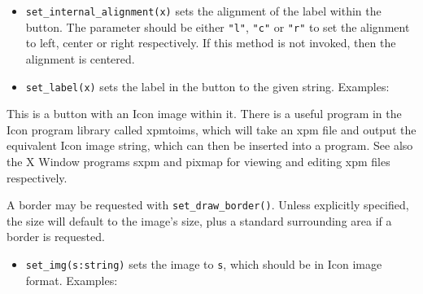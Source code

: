 \begin{itemize}
\item\noindent\texttt{set\_internal\_alignment(x)} sets the alignment of the label within the
button. The \linebreak parameter should be either \texttt{"l"}, \texttt{"c"} or \texttt{"r"} to
set the alignment to left, center or right respectively. If this method
is not invoked, then the alignment is centered.

\item\noindent\texttt{set\_label(x)} sets the label in the button to the given string.
Examples:

\end{itemize}

\medskip{}

This is a button with an Icon image within it. There is a useful program
in the Icon program library called xpmtoims, which will take an xpm
file and output the equivalent Icon image string, which can then be
inserted into a program. See also the X Window programs sxpm and pixmap
for viewing and editing xpm files respectively.

A border may be requested with \texttt{set\_draw\_border()}. Unless explicitly
specified, the size will default to the image's size,
plus a standard surrounding area if a border is requested.

\begin{itemize}
\item\noindent\texttt{set\_img(s:string)} sets the image to \texttt{s}, which should
be in Icon image format. Examples:

\end{itemize}

